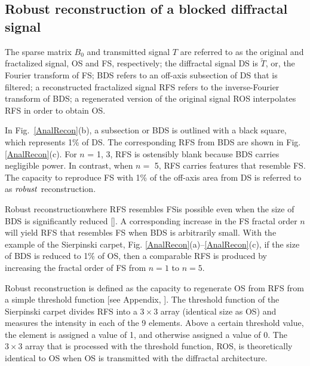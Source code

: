 \subsection{Robust reconstruction of a blocked diffractal signal} 

The sparse matrix $B_0$ and transmitted signal $T$ are referred to as the original and fractalized signal, OS and FS, respectively; the diffractal signal DS is $\tilde{T}$, or, the Fourier transform of FS; BDS refers to an off-axis subsection of DS that is filtered; a reconstructed fractalized signal RFS refers to the inverse-Fourier transform of BDS; a regenerated version of the original signal ROS interpolates RFS in order to obtain OS.  

In Fig.~\ref{AnalRecon}(b), a subsection or BDS is outlined with a black square, which represents 1\% of DS. The corresponding RFS from BDS are shown in Fig. \ref{AnalRecon}(c). For $n$ = 1, 3, RFS is ostensibly blank because BDS carries negligible power.  In contrast, when $n=$ 5, RFS carries features that resemble FS. The capacity to reproduce FS with 1\% of the off-axis area from DS is referred to as ${\it robust}$ reconstruction.  

Robust reconstruction\textemdash where RFS resembles FS\textemdash is possible even when the size of BDS is significantly reduced [\cite{Verma}].  A corresponding increase in the FS fractal order $n$ will yield RFS that resembles FS when BDS is arbitrarily small. With the example of the Sierpinski carpet, Fig. \ref{AnalRecon}(a)--\ref{AnalRecon}(c), if the size of BDS is reduced to 1\% of OS, then a comparable RFS is produced by increasing the fractal order of FS from $n=1$ to $n = 5$. 

Robust reconstruction is defined as the capacity to regenerate OS from RFS from a simple threshold function [see Appendix, \cite{Code2}]. The threshold function of the Sierpinski carpet divides RFS into a $3\times 3$ array (identical size as OS) and measures the intensity in each of the 9 elements. Above a certain threshold value, the element is assigned a value of 1, and otherwise assigned a value of 0. The $3\times 3$ array that is processed with the threshold function, ROS, is theoretically identical to OS when OS is transmitted with the diffractal architecture. 

%	
%	

